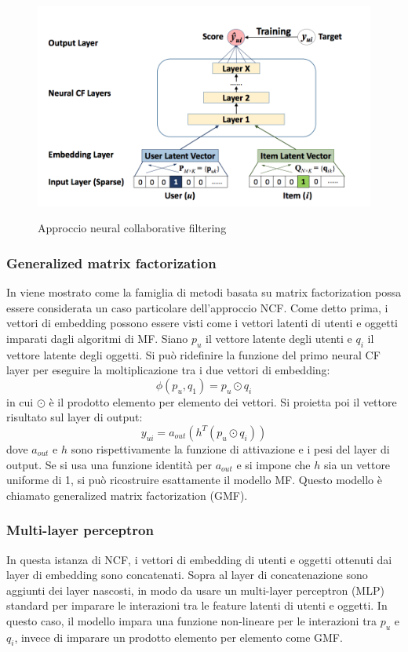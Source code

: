 \documentclass[12pt,italian]{report}
\begin{document}
\begin{figure}
  \centering
  \includegraphics[width=\linewidth]{immagini/ncf.png}
  \caption{Approccio neural collaborative filtering}
  \cite{NCF}
  \label{fig:ncf}
\end{figure}

\subsubsection{Generalized matrix factorization} \label{sssec:gmf}
In \cite{NCF} viene mostrato come la famiglia di metodi basata su matrix factorization possa essere considerata un caso particolare dell'approccio NCF. Come detto prima, i vettori di embedding possono essere visti come i vettori latenti di utenti e oggetti imparati dagli algoritmi di MF. Siano $p_u$ il vettore latente degli utenti e $q_i$ il vettore latente degli oggetti. Si può ridefinire la funzione del primo neural CF layer per eseguire la moltiplicazione tra i due vettori di embedding:
$$
\phi(p_u, q_1) = p_u \odot q_i
$$
in cui $\odot$ è il prodotto elemento per elemento dei vettori. Si proietta poi il vettore risultato sul layer di output:
$$
y_{ui} = a_{out}(h^T(p_u \odot q_i))
$$
dove $a_{out}$ e $h$ sono rispettivamente la funzione di attivazione e  i pesi del layer di output.  Se si usa una funzione identità per $a_{out}$ e si impone che $h$ sia un vettore uniforme di 1, si può ricostruire esattamente il modello MF. Questo modello è chiamato generalized matrix factorization (GMF).

\subsubsection{Multi-layer perceptron} \label{sssec:mlp}
In questa istanza di NCF, i vettori di embedding di utenti e oggetti ottenuti dai layer di embedding sono concatenati. Sopra al layer di concatenazione sono aggiunti dei layer nascosti, in modo da usare un multi-layer perceptron (MLP) standard per imparare le interazioni tra le feature latenti di utenti e oggetti. In questo caso, il modello impara una funzione non-lineare per le interazioni tra $p_u$ e $q_i$, invece di imparare un prodotto elemento per elemento come GMF. 
\end{document}
